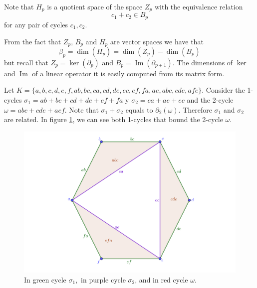 \documentclass[
	fontsize=10pt, %
	twoside=false, %
	secnumdepth=1, %
]{kaobook}
\DeclareMathOperator{\im}{Im}
\begin{document}
Note that $H_p$ is a quotient space of the space $Z_p$ with the equivalence relation $$c_1+c_2\in B_p$$ for any pair of cycles $c_1,c_2.$

\begin{remark}
    From the fact that $Z_p,\, B_p$ and $H_p$ are vector spaces we have that $$\beta_p=\dim(H_p)=\dim(Z_p)-\dim(B_p)$$ but recall that $Z_p=\ker(\partial_p)$ and $B_p=\im(\partial_{p+1}).$ The dimensions of $\ker$ and $\im$ of a linear operator it is easily computed from its matrix form.
\end{remark}

\begin{example}
    Let $K=\{a,b,c,d,e,f, ab, bc, ca, cd, de, ec, ef, fa, ae, abc, cde, afe\}.$ Consider the 1-cycles $\sigma_1=ab+bc+cd+de+ef+fa$ y $\sigma_2=ca+ae+ec$ and the 2-cycle $\omega=abc+cde+aef.$ Note that $\sigma_1+\sigma_2$ equals to $\partial_2(\omega).$ Therefore $\sigma_1$ and $\sigma_2$ are related.
    In figure \ref{C2:fig:BoundaryEquivalence}, we can see both 1-cycles that bound the 2-cycle $\omega.$
    \begin{figure}[H]
        \centering
        \includegraphics{boundaryequivalence.png}
        \caption{In green cycle $\sigma_1,$ in purple cycle $\sigma_2$, and in red cycle $\omega$.}
        \label{C2:fig:BoundaryEquivalence}
    \end{figure}
\end{example}
\end{document}
